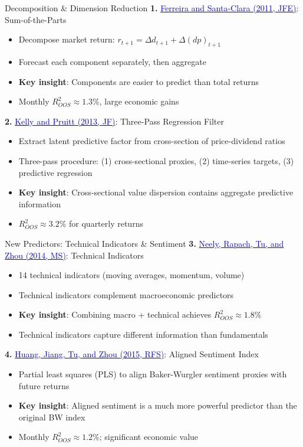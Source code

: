\documentclass{beamer}
\begin{document}
\begin{frame}{Decomposition \& Dimension Reduction}
	\textbf{1.} \href{https://doi.org/10.1016/j.jfineco.2011.02.003}{\textcolor{blue}{Ferreira and Santa-Clara (2011, JFE)}}: Sum-of-the-Parts
	\begin{itemize}
		\item Decompose market return: $r_{t+1} = \Delta d_{t+1} + \Delta (dp)_{t+1}$
		\item Forecast each component separately, then aggregate
		\item \textbf{Key insight}: Components are easier to predict than total returns
		\item Monthly $R^2_{OOS} \approx 1.3\%$, large economic gains
	\end{itemize}

	\vspace{8pt}
	\textbf{2.} \href{https://doi.org/10.1111/jofi.12060}{\textcolor{blue}{Kelly and Pruitt (2013, JF)}}: Three-Pass Regression Filter
	\begin{itemize}
		\item Extract latent predictive factor from cross-section of price-dividend ratios
		\item Three-pass procedure: (1) cross-sectional proxies, (2) time-series targets, (3) predictive regression
		\item \textbf{Key insight}: Cross-sectional value dispersion contains aggregate predictive information
		\item $R^2_{OOS} \approx 3.2\%$ for quarterly returns
	\end{itemize}
\end{frame}

\begin{frame}{New Predictors: Technical Indicators \& Sentiment}
	\textbf{3.} \href{https://doi.org/10.1287/mnsc.2013.1838}{\textcolor{blue}{Neely, Rapach, Tu, and Zhou (2014, MS)}}: Technical Indicators
	\begin{itemize}
		\item 14 technical indicators (moving averages, momentum, volume)
		\item Technical indicators complement macroeconomic predictors
		\item \textbf{Key insight}: Combining macro + technical achieves $R^2_{OOS} \approx 1.8\%$
		\item Technical indicators capture different information than fundamentals
	\end{itemize}

	\vspace{8pt}
	\textbf{4.} \href{https://doi.org/10.1093/rfs/hhu080}{\textcolor{blue}{Huang, Jiang, Tu, and Zhou (2015, RFS)}}: Aligned Sentiment Index
	\begin{itemize}
		\item Partial least squares (PLS) to align Baker-Wurgler sentiment proxies with future returns
		\item \textbf{Key insight}: Aligned sentiment is a much more powerful predictor than the original BW index
		\item Monthly $R^2_{OOS} \approx 1.2\%$; significant economic value
	\end{itemize}
\end{frame}
\end{document}
